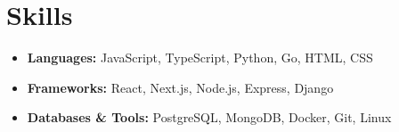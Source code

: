 \documentclass[11pt]{article}
\begin{document}
\section{Skills}
\begin{itemize}
  \item \textbf{Languages:} JavaScript, TypeScript, Python, Go, HTML, CSS
  \item \textbf{Frameworks:} React, Next.js, Node.js, Express, Django
  \item \textbf{Databases \& Tools:} PostgreSQL, MongoDB, Docker, Git, Linux
\end{itemize}
\end{document}
